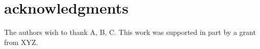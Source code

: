 \documentclass{egpubl}
\begin{document}
	
	
	\section*{acknowledgments}
		The authors wish to thank A, B, C. This work was supported in part by
		a grant from XYZ.
	
	
%	
	
	
\end{document}
